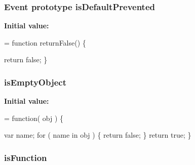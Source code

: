 \hypertarget{jquery-1_810_82-vsdoc_8js_af36c584d7af0deb379b8d6e3116775cc}{
\subsubsection[{is\-Default\-Prevented}]{ {\bf Event} {\bf prototype} is\-Default\-Prevented}}\label{jquery-1_810_82-vsdoc_8js_af36c584d7af0deb379b8d6e3116775cc}
{\bfseries Initial value\-:}
\begin{DoxyCode}
= \textcolor{keyword}{function} returnFalse() \{


    \textcolor{keywordflow}{return} \textcolor{keyword}{false};
\}
\end{DoxyCode}
\hypertarget{jquery-1_810_82-vsdoc_8js_aaf2bcef7602f40b9d2e1d70f197e44d1}{
\subsubsection[{is\-Empty\-Object}]{ is\-Empty\-Object}}\label{jquery-1_810_82-vsdoc_8js_aaf2bcef7602f40b9d2e1d70f197e44d1}
{\bfseries Initial value\-:}
\begin{DoxyCode}
= \textcolor{keyword}{function}( obj ) \{


        var name;
        \textcolor{keywordflow}{for} ( name in obj ) \{
            \textcolor{keywordflow}{return} \textcolor{keyword}{false};
        \}
        \textcolor{keywordflow}{return} \textcolor{keyword}{true};
    \}
\end{DoxyCode}
\hypertarget{jquery-1_810_82-vsdoc_8js_a02aa8413df0c687cbb1cd77943741d5a}{
\subsubsection[{is\-Function}]{ is\-Function}}\label{jquery-1_810_82-vsdoc_8js_a02aa8413df0c687cbb1cd77943741d5a}
